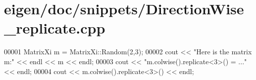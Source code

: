 \hypertarget{eigen_2doc_2snippets_2_direction_wise__replicate_8cpp_source}{}\section{eigen/doc/snippets/\+Direction\+Wise\+\_\+replicate.cpp}
\label{eigen_2doc_2snippets_2_direction_wise__replicate_8cpp_source}

\begin{DoxyCode}
00001 MatrixXi m = MatrixXi::Random(2,3);
00002 cout << \textcolor{stringliteral}{"Here is the matrix m:"} << endl << m << endl;
00003 cout << \textcolor{stringliteral}{"m.colwise().replicate<3>() = ..."} << endl;
00004 cout << m.colwise().replicate<3>() << endl;
\end{DoxyCode}
